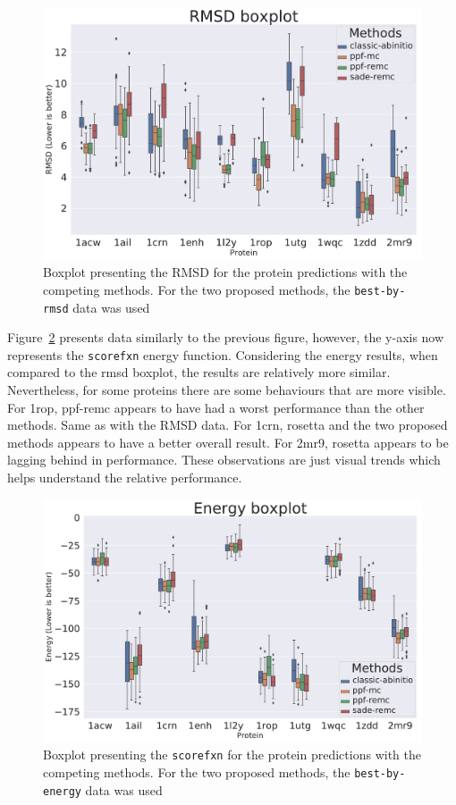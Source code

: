 \begin{figure}
  \includegraphics[width=\linewidth]{Figuras/boxplots/boxplot_best_by_rmsd_rmsd_after.pdf}
  \caption{Boxplot presenting the RMSD for the protein predictions with the
    competing methods. For the two proposed methods, the \texttt{best-by-rmsd}
    data was used}
  \label{fig:boxplot-rmsd}
\end{figure}

Figure~\ref{fig:boxplot-energy} presents data similarly to the previous figure,
however, the y-axis now represents the \texttt{scorefxn} energy function. Considering
the energy results, when compared to the rmsd boxplot, the results are relatively
more similar. Nevertheless, for some proteins there are some behaviours that are
more visible. For 1rop, ppf-remc appears to have had a worst performance
than the other methods. Same as with the RMSD data. For 1crn, rosetta and the two
proposed methods appears to have a better overall result. For 2mr9, rosetta
appears to be lagging behind in performance. These observations are just visual
trends which helps understand the relative performance.

\begin{figure}
  \includegraphics[width=\linewidth]{Figuras/boxplots/boxplot_best_by_energy_scorefxn.pdf}
  \caption{Boxplot presenting the \texttt{scorefxn} for the protein predictions with the
    competing methods. For the two proposed methods, the \texttt{best-by-energy}
    data was used}
  \label{fig:boxplot-energy}
\end{figure}

